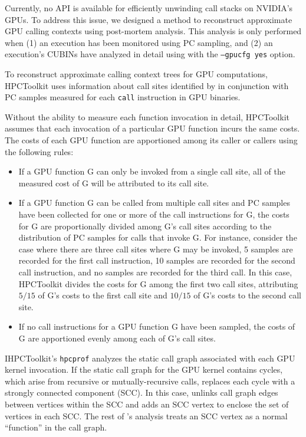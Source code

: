 Currently, no API is available for efficiently unwinding call stacks on NVIDIA's GPUs.
To address this issue, we designed a method to reconstruct approximate GPU calling contexts using post-mortem analysis. This analysis is only performed when (1) an execution has been monitored using PC sampling, and (2) an execution's CUBINs have analyzed in detail using \hpcstruct{} with the {\tt --gpucfg yes} option.

To reconstruct approximate calling context trees for GPU computations, HPCToolkit uses information about call sites identified by \hpcstruct{} in conjunction with PC samples measured for each {\tt call} instruction in GPU binaries.

Without the ability to measure each function invocation in detail, HPCToolkit assumes that each invocation of a particular GPU function incurs the same costs. The costs of each GPU function are apportioned among its caller or callers using the following rules:

\begin{itemize}
\item
If a GPU function G can only be invoked from a single call site, all of the measured cost of G will be attributed to its call site.
\item
If a GPU function G can be called from multiple call sites and PC samples have been collected for one or more of the call instructions for G, the costs for G are proportionally divided among G's call sites according to the distribution of PC samples for calls that invoke G.  For instance, consider the case where there are three call sites where G may be invoked, 5 samples are recorded for the first call instruction, 10 samples are recorded for the second call instruction, and no samples are recorded for the third call. In this case, HPCToolkit divides the costs for G  among the first two call sites, attributing $5/15$ of G's costs  to the first call site and $10/15$ of G's costs to the second call site.
\item
If no call instructions for a GPU function G have been sampled, the costs of G are apportioned evenly among each of G's call sites.
\end{itemize}

IHPCToolkit's {\tt hpcprof} analyzes the static call graph associated with each GPU kernel invocation. If the static call graph for the GPU kernel contains cycles, which arise from recursive or mutually-recursive calls,  \hpcprof{} replaces each cycle with a strongly connected component (SCC). In this case, \hpcprof{} unlinks call graph edges between vertices within the SCC and adds an SCC vertex to enclose the set of vertices in each SCC. The rest of \hpcprof{}'s analysis
treats an SCC vertex as a normal ``function'' in the call graph.


